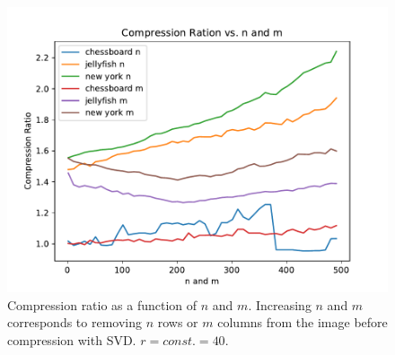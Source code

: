 \documentclass[12pt]{article}
\begin{document}
\begin{figure}[h]
	\includegraphics[width = \textwidth]{figures/compression_ratio_nm.pdf}
	\caption{Compression ratio as a function of $n$ and $m$. Increasing $n$ and $m$ corresponds to removing $n$ rows or $m$ columns from the image before compression with SVD. $r = const. = 40$.}
	\label{fig:comp-nm}
\end{figure}
\end{document}
